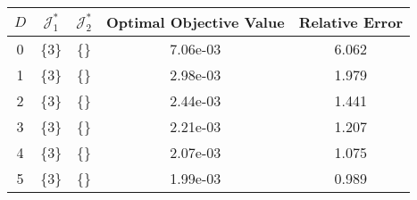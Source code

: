 \begin{subtable}{\textwidth}
\centering
\begin{tabular}{|c|c|c|c|c|}
  \hline
$D$ & $\mathcal J_1^*$ & $\mathcal J_2^*$ & Optimal Objective Value & Relative Error \\ 
  \hline
0 & \{3\} & \{\} & 7.06e-03 & 6.062 \\ 
  1 & \{3\} & \{\} & 2.98e-03 & 1.979 \\ 
  2 & \{3\} & \{\} & 2.44e-03 & 1.441 \\ 
  3 & \{3\} & \{\} & 2.21e-03 & 1.207 \\ 
  4 & \{3\} & \{\} & 2.07e-03 & 1.075 \\ 
  5 & \{3\} & \{\} & 1.99e-03 & 0.989 \\ 
   \hline
\end{tabular}
\end{subtable}
